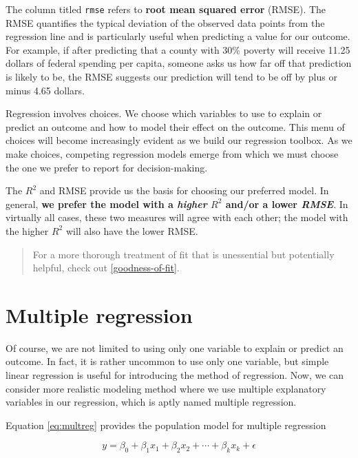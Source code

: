 \documentclass[
]{book}
\begin{document}
The column titled \texttt{rmse} refers to \textbf{root mean squared error} (RMSE). The RMSE quantifies the typical deviation of the observed data points from the regression line and is particularly useful when predicting a value for our outcome. For example, if after predicting that a county with 30\% poverty will receive 11.25 dollars of federal spending per capita, someone asks us how far off that prediction is likely to be, the RMSE suggests our prediction will tend to be off by plus or minus 4.65 dollars.

Regression involves choices. We choose which variables to use to explain or predict an outcome and how to model their effect on the outcome. This menu of choices will become increasingly evident as we build our regression toolbox. As we make choices, competing regression models emerge from which we must choose the one we prefer to report for decision-making.

The \(R^2\) and RMSE provide us the basis for choosing our preferred model. In general, \textbf{we prefer the model with a \emph{higher} \(R^2\) and/or a lower \emph{RMSE}}. In virtually all cases, these two measures will agree with each other; the model with the higher \(R^2\) will also have the lower RMSE.

\begin{quote}
For a more thorough treatment of fit that is unessential but potentially helpful, check out \ref{goodness-of-fit}.
\end{quote}

\hypertarget{multiple-regression}{%
\section{Multiple regression}\label{multiple-regression}}

Of course, we are not limited to using only one variable to explain or predict an outcome. In fact, it is rather uncommon to use only one variable, but simple linear regression is useful for introducing the method of regression. Now, we can consider more realistic modeling method where we use multiple explanatory variables in our regression, which is aptly named multiple regression.

Equation \eqref{eq:multreg} provides the population model for multiple regression

\begin{equation}
y=\beta_0+\beta_1x_1+\beta_2x_2+\cdots+\beta_kx_k+\epsilon
\label{eq:multreg}
\end{equation}
\end{document}
